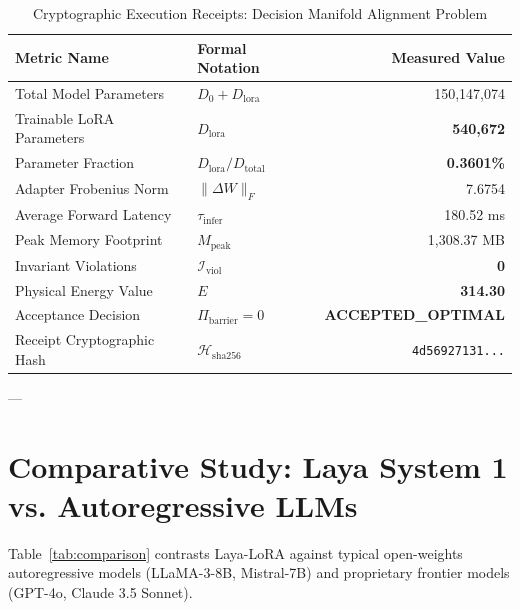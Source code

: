 \documentclass[10pt,journal,compsoc]{IEEEtran}
\theoremstyle{remark}
\begin{document}
\begin{table}[htbp]
\caption{Cryptographic Execution Receipts: Decision Manifold Alignment Problem}
\label{tab:manifold_benchmark}
\centering
\begin{tabular}{llr}
\toprule
\textbf{Metric Name} & \textbf{Formal Notation} & \textbf{Measured Value} \\
\midrule
Total Model Parameters & $D_0 + D_{\text{lora}}$ & 150,147,074 \\
Trainable LoRA Parameters & $D_{\text{lora}}$ & \textbf{540,672} \\
Parameter Fraction & $D_{\text{lora}} / D_{\text{total}}$ & \textbf{0.3601\%} \\
Adapter Frobenius Norm & $\|\Delta W\|_F$ & 7.6754 \\
Average Forward Latency & $\tau_{\text{infer}}$ & 180.52 ms \\
Peak Memory Footprint & $M_{\text{peak}}$ & 1,308.37 MB \\
Invariant Violations & $\mathcal{I}_{\text{viol}}$ & \textbf{0} \\
Physical Energy Value & $E$ & \textbf{314.30} \\
Acceptance Decision & $\Pi_{\text{barrier}} = 0$ & \textbf{ACCEPTED\_OPTIMAL} \\
Receipt Cryptographic Hash & $\mathcal{H}_{\text{sha256}}$ & \texttt{4d56927131...} \\
\bottomrule
\end{tabular}
\end{table}

---

\section{Comparative Study: Laya System 1 vs. Autoregressive LLMs}

Table~\ref{tab:comparison} contrasts Laya-LoRA against typical open-weights autoregressive models (LLaMA-3-8B, Mistral-7B) and proprietary frontier models (GPT-4o, Claude 3.5 Sonnet).
\end{document}
